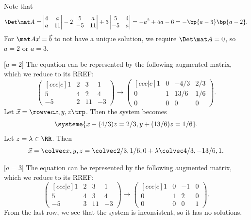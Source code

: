 \begin{solution}
    Note that \[\Det \mat A = \begin{vmatrix}4 & a \\ a & 11\end{vmatrix} - 2\begin{vmatrix}5 & a \\ -5 & 11\end{vmatrix} + 3\begin{vmatrix}5 & 4 \\ -5 & a\end{vmatrix} = -a^2 + 5a - 6 = -\bp{a-3}\bp{a-2}.\] For $\mat A \vec x = \vec b$ to not have a unique solution, we require $\Det \mat A = 0$, so $a = 2$ or $a = 3$.

    [$a = 2$] The equation can be represented by the following augmented matrix, which we reduce to its RREF: \[\begin{pmatrix}[ccc|c] 1 & 2 & 3 & 1 \\ 5 & 4 & 2 & 4 \\ -5 & 2 & 11 & -3\end{pmatrix} \rightarrow \begin{pmatrix}[ccc|c] 1 & 0 & -4/3 & 2/3 \\[0.5em] 0 & 1 & 13/6 & 1/6 \\[0.5em] 0 & 0 & 0 & 0\end{pmatrix}.\] Let $\vec x = \cveciiix{x}{y}{z}$. Then the system becomes \[\systeme{x - (4/3) z = 2/3, y + (13/6) z = 1/6}.\] Let $z = \l \in \RR$. Then \[\vec x = \cveciii{x}{y}{z} = \cveciii{2/3}{1/6}{0} + \l \cveciii{4/3}{-13/6}{1}.\]

    [$a = 3$] The equation can be represented by the following augmented matrix, which we reduce to its RREF: \[\begin{pmatrix}[ccc|c] 1 & 2 & 3 & 1 \\ 5 & 4 & 3 & 4 \\ -5 & 3 & 11 & -3\end{pmatrix} \rightarrow \begin{pmatrix}[ccc|c] 1 & 0 & -1 & 0 \\ 0 & 1 & 2 & 0 \\ 0 & 0 & 0 & 1\end{pmatrix}.\] From the last row, we see that the system is inconsistent, so it has no solutions.
\end{solution}